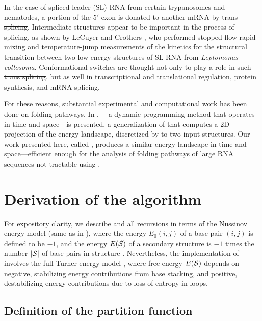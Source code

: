 \documentclass[11pt, oneside]{Thesis} %
\providecommand{\DIFadd}[1]{{\protect\color{blue}\uwave{#1}}} %
\providecommand{\DIFdel}[1]{{\protect\color{red}\sout{#1}}}                      %
\providecommand{\DIFaddbegin}{} %
\providecommand{\DIFaddend}{} %
\providecommand{\DIFdelbegin}{} %
\providecommand{\DIFdelend}{} %
\begin{document}
In the case of spliced leader (SL) RNA from certain trypanosomes and nematodes,
a portion of the $5'$ exon is donated to
another mRNA by \DIFdelbegin \DIFdel{trans splicing}\DIFdelend \DIFaddbegin \DIFadd{trans-splicing}\DIFaddend .
Intermediate structures appear to be important in the process of splicing,
as shown by LeCuyer and Crothers \citep{lecuyercrothers}, who performed
stopped-flow rapid-mixing and temperature-jump measurements
of the kinetics for the structural transition between two low
energy structures of SL RNA from {\em Leptomonas collosoma}.
Conformational switches are thought not only to play a role in such
\DIFdelbegin \DIFdel{trans splicing}\DIFdelend \DIFaddbegin \DIFadd{trans-splicing}\DIFaddend , but as well in transcriptional and
translational regulation, protein synthesis, and mRNA splicing.

For these reasons, substantial experimental and computational work
has been done on folding pathways. In \citep{lorenz}, \rnatwofold---a dynamic
programming method that operates in
 time and  space---is presented, a generalization of \rnabor
\citep{freyhult.b07} that computes a \DIFdelbegin \DIFdel{2D }\DIFdelend \DIFaddbegin \twoD \DIFaddend projection of the energy landscape,
discretized by \bpd to two input structures. Our work presented
here, called \ffttwo, produces a similar energy landscape in  time and
 space---efficient enough for the analysis of folding pathways of large
RNA sequences not tractable using \rnatwofold.

\section{Derivation of the \ffttwo algorithm}
\label{sec:ffttwo:math}

For expository clarity, we describe \ffttwo \citep{senter.jmb14}
and all recursions
in terms of the Nussinov energy model \citep{nussinovjacobson}
(same as in ), where
the energy $E_0(i,j)$ of a base pair $(i,j)$ is defined to be $-1$, and the
energy $E(\mathcal S)$ of a secondary structure \str is $-1$ times the number $|\mathcal S|$
of base pairs in structure \str.  Nevertheless, the implementation of
\ffttwo involves the full Turner energy model \citep{xia:RNA}, where
free energy $E(\mathcal S)$ depends on negative, stabilizing energy contributions
from base stacking, and positive, destabilizing energy contributions due to
loss of entropy in loops.

\subsection{Definition of the partition function
\texorpdfstring{}{}}
\label{subsec:ffttwo:recursions}
\end{document}
